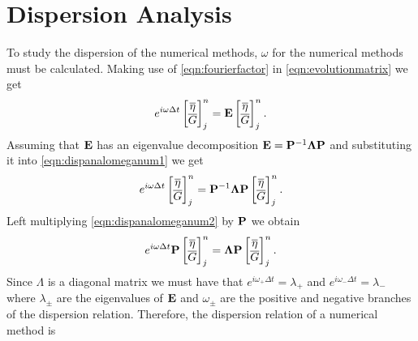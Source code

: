 \section{Dispersion Analysis}
To study the dispersion of the numerical methods, $\omega$ for the numerical methods must be calculated. Making use of \eqref{eqn:fourierfactor} in \eqref{eqn:evolutionmatrix} we get 
\begin{equation}
e^{i \omega \Delta t}\begin{bmatrix}
\overline{\eta} \\ \overline{G}
\end{bmatrix}^{n}_j =  \mathbf{E}\begin{bmatrix}
\overline{\eta} \\ \overline{G}
\end{bmatrix}^{n}_j.
\label{eqn:dispanalomeganum1}
\end{equation}
Assuming that $\mathbf{E}$ has an eigenvalue decomposition $\mathbf{E} = \mathbf{P}^{-1} \mathbf{\Lambda} \mathbf{P}$ and substituting it into \eqref{eqn:dispanalomeganum1} we get
\begin{equation}
e^{i \omega \Delta t}\begin{bmatrix}
\overline{\eta} \\ \overline{G}
\end{bmatrix}^{n}_j =  \mathbf{P}^{-1} \mathbf{\Lambda} \mathbf{P}\begin{bmatrix}
\overline{\eta} \\ \overline{G}
\end{bmatrix}^{n}_j.
\label{eqn:dispanalomeganum2}
\end{equation}
Left multiplying \eqref{eqn:dispanalomeganum2} by $\mathbf{P}$ we obtain
\begin{equation}
e^{i \omega \Delta t} \mathbf{P}\begin{bmatrix}
\overline{\eta} \\ \overline{G}
\end{bmatrix}^{n}_j =   \mathbf{\Lambda} \mathbf{P}\begin{bmatrix}
\overline{\eta} \\ \overline{G}
\end{bmatrix}^{n}_j.
\label{eqn:dispanalomeganum3}
\end{equation}
Since $\Lambda$ is a diagonal matrix we must have that $e^{i \omega_+ \Delta t} = \lambda_+$ and $e^{i \omega_- \Delta t} = \lambda_-$ where $\lambda_\pm$ are the eigenvalues of $\mathbf{E}$ and $\omega_\pm$ are the positive and negative branches of the dispersion relation. Therefore, the dispersion relation of a numerical method is
